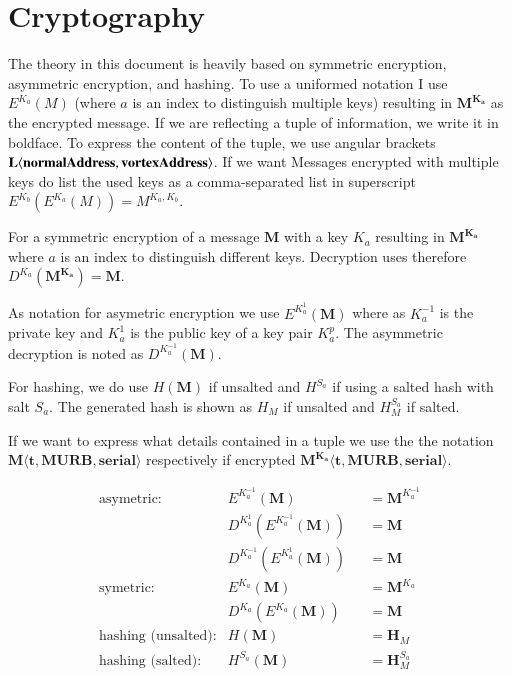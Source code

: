 \section{Cryptography \label{sec:encNot}}
The theory in this document is heavily based on symmetric encryption, asymmetric encryption, and hashing. To use a uniformed notation I use $E^{K_a}(M)$ (where $a$ is an index to distinguish multiple keys) resulting in $\mathbf{M^{K_a}}$ as the encrypted message. If we are reflecting a tuple of information, we write it in boldface. To express the content of the tuple, we use angular brackets $\splitatcommas{\mathbf{L\langle normalAddress,vortexAddress\rangle }}$. If we want Messages encrypted with multiple keys do list the used keys as a comma-separated list in superscript $E^{K_b}\left(E^{K_a}\left(M\right)\right)=M^{{K_{a}},{K_b}}$.

For a symmetric encryption of a message $\mathbf{M}$ with a key $K_a$ resulting in $\mathbf{M^{K_a}}$ where $a$ is an index to distinguish different keys. Decryption uses therefore $D^{K_a}(\mathbf{M^{K_a}})=\mathbf{M}$.

As notation for asymetric encryption we use $E^{K^{1}_a}(\mathbf{M})$ where as $K^{-1}_a$ is the private key and $K^{1}_a$ is the public key of a key pair $K^p_a$. The asymmetric decryption is noted as $D^{K^{-1}_a}(\mathbf{M})$.

For hashing, we do use $H(\mathbf{M})$ if unsalted and $H^{S_a}$ if using a salted hash with salt $S_a$. The generated hash is shown as $H_M$ if unsalted and $H^{S_a}_M$ if salted.

If we want to express what details contained in a tuple we use the the notation $\mathbf{M\langle t,MURB,serial\rangle }$ respectively if encrypted $\mathbf{M^{K_{a}}\langle t,MURB,serial\rangle}$.

\begin{align*}
\text{asymetric:}         & E^{K^{-1}_a}\left(\mathbf{M}\right)                            && =\mathbf{M}^{K^{-1}_a}\\
& D^{K^{1}_a}\left(E^{K^{-1}_a}\left(\mathbf{M}\right)\right)    && =\mathbf{M}\\
& D^{K^{-1}_a}\left(E^{K^{1}_a}\left(\mathbf{M}\right)\right)    && =\mathbf{M}\\
\text{symetric:}          & E^{K_a}\left(\mathbf{M}\right)                                 && =\mathbf{M}^{K_a}\\
& D^{K_a}\left(E^{K_a}\left(\mathbf{M}\right)\right)          && =\mathbf{M}\\
\text{hashing (unsalted):}& H\left(\mathbf{M}\right)                                       && =\mathbf{H}_M\\
\text{hashing (salted):}  & H^{S_a}\left(\mathbf{M}\right)                                 && =\mathbf{H}^{S_a}_M
\end{align*}

